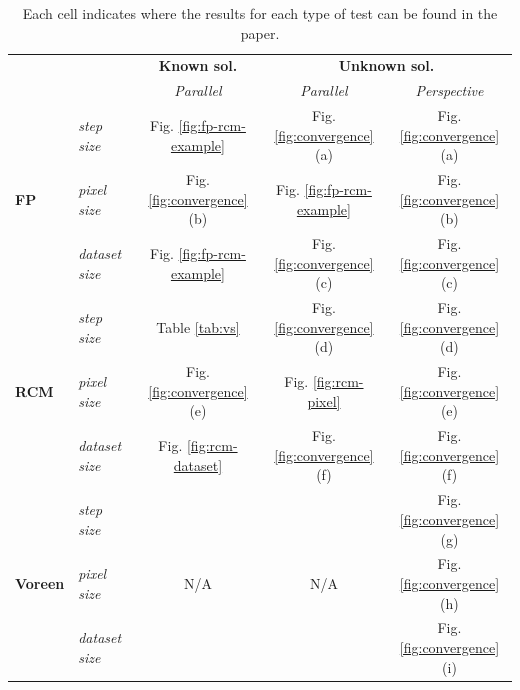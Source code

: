 \begin{table}[t]
\caption{Each cell indicates where the results for each type of test
  can be found in the paper.}
  \centering
\begin{tabular}{ l l | c | c c}
                              &                     & \textbf{Known sol.}             & \multicolumn{2}{c}{\textbf{Unknown sol.}}\\
                              &                     &  \emph{Parallel}                & \emph{Parallel} & \emph{Perspective}\\
\hline
\multirow{3}{*}{\bf{FP}}      & \emph{step size}    &  Fig. \ref{fig:fp-rcm-example} & Fig. \ref{fig:convergence}(a) & Fig. \ref{fig:convergence}(a)\\
                              & \emph{pixel size}   &  Fig. \ref{fig:convergence}(b) & Fig. \ref{fig:fp-rcm-example} & Fig. \ref{fig:convergence}(b)\\
                              & \emph{dataset size} &  Fig. \ref{fig:fp-rcm-example} & Fig. \ref{fig:convergence}(c) & Fig. \ref{fig:convergence}(c)\\
\hline
\multirow{3}{*}{\bf{RCM}}     & \emph{step size}    &  Table \ref{tab:vs}            & Fig. \ref{fig:convergence}(d) & Fig. \ref{fig:convergence}(d)\\
                              & \emph{pixel size}   &  Fig. \ref{fig:convergence}(e) & Fig. \ref{fig:rcm-pixel}       & Fig. \ref{fig:convergence}(e)\\
                              & \emph{dataset size} &  Fig. \ref{fig:rcm-dataset}    & Fig. \ref{fig:convergence}(f) & Fig. \ref{fig:convergence}(f)\\
\hline
\multirow{3}{*}{\bf{Voreen}}  & \emph{step size}    &  \multirow{3}{*}{N/A}          &   \multirow{3}{*}{N/A}         & Fig. \ref{fig:convergence}(g)\\
                              & \emph{pixel size}   &                                &                                & Fig. \ref{fig:convergence}(h)\\
                              & \emph{dataset size} &                                &                                & Fig. \ref{fig:convergence}(i)\\
\end{tabular}
\label{tab:summary}
\end{table}


